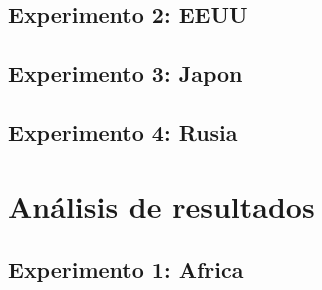 \newpage
\subsection{Experimento 2: EEUU}

\begin{landscape}

\end{landscape}

\newpage
\subsection{Experimento 3: Japon}

\begin{landscape}

\end{landscape}

\newpage
\subsection{Experimento 4: Rusia}

\begin{landscape}

\end{landscape}



	
\section{Análisis de resultados}

\subsection{Experimento 1: Africa}

